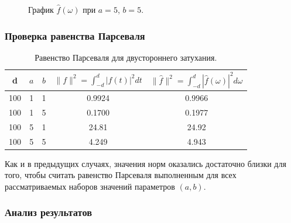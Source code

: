 \documentclass[a5paper, 10pt]{article}
\theoremstyle{definition}
\theoremstyle{plain}
\theoremstyle{remark}
\begin{document}
\begin{figure}[h!]
\caption{График $\hat{f}(\omega)$ при $a = 5$, $b = 5$.}
\end{figure}



\subsubsection{Проверка равенства Парсеваля}

\begin{table}[h!]
\caption{Равенство Парсеваля для двустороннего затухания.}
\label{tabular:timesandtenses}
\begin{center}
\begin{tabular}{|c|c|c|c|c|}
\hline
d & $a$ & $b$ & $\| f \|^2 = \int_{-d}^d |f(t)|^2 dt $ & $\| \hat{f} \|^2 = \int_{-d}^d |\hat{f}(\omega)|^2 d\omega $ \\
\hline
100 & 1 & 1 &  0.9924& 0.9966\\
\hline
100 & 1 & 5 & 0.1700 & 0.1977\\
\hline
100 & 5 & 1 & 24.81 & 24.92 \\
\hline
100 & 5 & 5 & 4.249  & 4.943 \\
\hline
\end{tabular}
\end{center}
\end{table}

Как и в предыдущих случаях, значения норм оказались достаточно близки для того, чтобы считать равенство Парсеваля выполненным для всех рассматриваемых наборов значений параметров $(a, b)$.


\newpage
\subsubsection{Анализ результатов}
\end{document}

